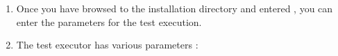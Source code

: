 
\begin{enumerate}
\item Once you have browsed to the \app{} installation directory and entered , you can enter the parameters for the test execution.
\item The test executor has various parameters :

\label{cmdlineparams}
\begin{supertabular}{|p{4.0cm}p{8.0cm}|}
\hline


\end{supertabular}
\end{enumerate}

